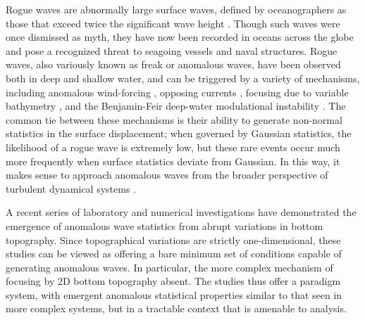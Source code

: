 \documentclass[11pt]{article}
\begin{document}
Rogue waves are abnormally large surface waves, defined by oceanographers as those that exceed twice the significant wave height \citep{muller2005rogue, ying2011linear}. Though such waves were once dismissed as myth, they have now been recorded in oceans across the globe and pose a recognized threat to seagoing vessels and naval structures. Rogue waves, also variously known as freak or anomalous waves, have been observed both in deep and shallow water, and can be triggered by a variety of mechanisms, including anomalous wind-forcing \citep{kharif2008influence, toffoli2017wind}, opposing currents \citep{garrett2009rogue, onorato2011triggering},
focusing due to variable bathymetry \citep{heller2008refraction, white1998chance}, 
and the Benjamin-Feir deep-water modulational instability \citep{benjamin1967disintegration, viotti2013emergence, cousins2015unsteady, farazmand2017reduced}.
The common tie between these mechanisms is their ability to generate non-normal statistics in the surface displacement; when governed by Gaussian statistics, the likelihood of a rogue wave is extremely low, but these rare events occur much more frequently when surface statistics deviate from Gaussian. In this way, it makes sense to approach anomalous waves from the broader perspective of turbulent dynamical systems \cite{sapsis2013a, sapsis2013b, sapsis2013blending, chen2016filtering, majda2016introduction, macedo2017universality, MajdaQiSIAM2018, blonigan2019extreme, guth2019machine}.

A recent series of laboratory \cite{bolles2019} and numerical investigations \cite{viotti2014} have demonstrated the emergence of anomalous wave statistics from abrupt variations in bottom topography. Since topographical variations are strictly one-dimensional, these studies can be viewed as offering a bare minimum set of conditions capable of generating anomalous waves. In particular, the more complex mechanism of focusing by 2D bottom topography absent. The studies thus offer a paradigm system, with emergent anomalous statistical properties similar to that seen in more complex systems, but in a tractable context that is amenable to analysis.
\end{document}
